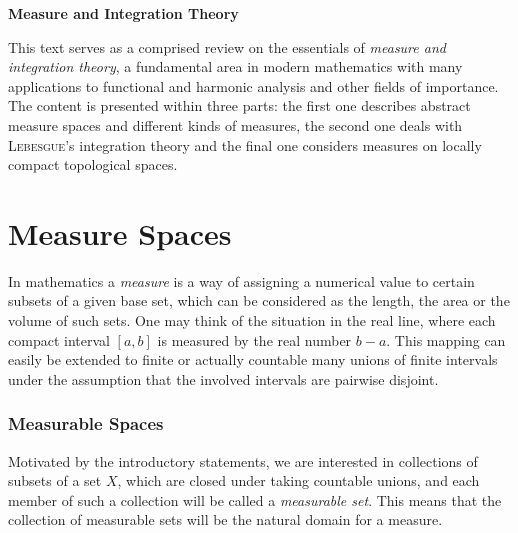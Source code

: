 \documentclass[11pt,twoside]{article}
\begin{document}
\thispagestyle{empty}

\def\Title{Measure and Integration Theory}

\centerline{\large{\textbf{\Title}}}
\vspace{4pt}
\centerline{\small{\textsc{\Author}}}
\vspace{10pt}



\fancyhead[OL]{\small{\thepage}}
\fancyhead[ER]{\small{\thepage}}

This text serves as a comprised review on the essentials
of \textit{measure and integration theory},
a fundamental area in modern mathematics with many applications
to functional and harmonic analysis and other fields of importance.
The content is presented within three parts:
the first one describes abstract measure spaces and different kinds of
measures, the second one deals with \textsc{Lebesgue}'s integration theory
and the final one considers measures on locally compact topological spaces.

\part{Measure Spaces}                                                          %
In mathematics a \textit{measure} is
a way of assigning a numerical value to certain subsets of a given base set,
which can be considered as the length, the area or the volume of such sets.
One may think of the situation in the real line,
where each compact interval $[a,b]$ is measured by the real number $b{-}a$.
This mapping can easily be extended to finite or actually countable
many unions of finite intervals under the assumption
that the involved intervals are pairwise disjoint.

\section{Measurable Spaces}
Motivated by the introductory statements,
we are interested in collections of subsets of a set $X$,
which are closed under taking countable unions,
and each member of such a collection will be called a \textit{measurable set}.
This means
that the collection of measurable sets will be the natural domain for a measure.
\end{document}
